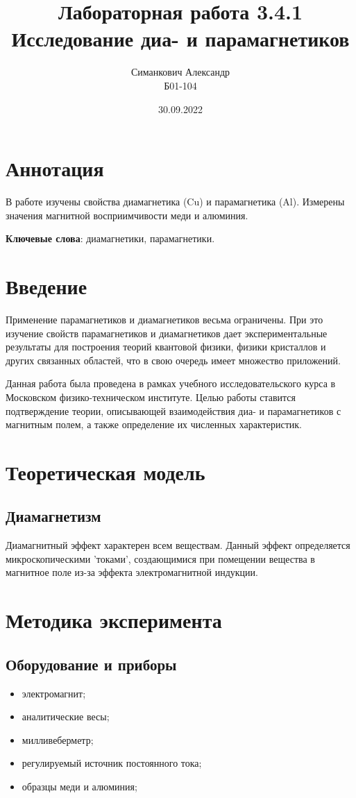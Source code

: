 \documentclass[12pt,a4paper]{article}
\title{Лабораторная работа 3.4.1\\ Исследование диа- и парамагнетиков}
\author{Симанкович Александр \\ Б01-104}
\date{30.09.2022}
\begin{document}
	\maketitle
	
	\section*{Аннотация}
	
	В работе изучены свойства диамагнетика (Cu) и парамагнетика (Al). Измерены значения магнитной восприимчивости меди и алюминия.
	
	\vspace{10pt}
	\noindent\textbf{Ключевые слова}: диамагнетики, парамагнетики.
	
	\section*{Введение}
		
	Применение парамагнетиков и диамагнетиков весьма ограничены. При это изучение свойств парамагнетиков и диамагнетиков дает экспериментальные результаты для построения теорий квантовой физики, физики кристаллов и других связанных областей, что в свою очередь имеет множество приложений.
	
	Данная работа была проведена в рамках учебного исследовательского курса в Московском физико-техническом институте. Целью работы ставится подтверждение теории, описывающей взаимодействия диа- и парамагнетиков с магнитным полем, а также определение их численных характеристик.
	
	\section*{Теоретическая модель}
	
	\subsection*{Диамагнетизм}
	
	Диамагнитный эффект характерен всем веществам. Данный эффект определяется микроскопическими 'токами', создающимися при помещении вещества в магнитное поле из-за эффекта электромагнитной индукции.
	
	\section*{Методика эксперимента}
	
	\subsection*{Оборудование и приборы}
	\begin{itemize}[itemsep = 0pt, parsep=0pt]
		\item электромагнит;
		\item аналитические весы;
		\item милливеберметр;
		\item регулируемый источник постоянного тока;
		\item образцы меди и алюминия;
	\end{itemize}
	
\end{document}
